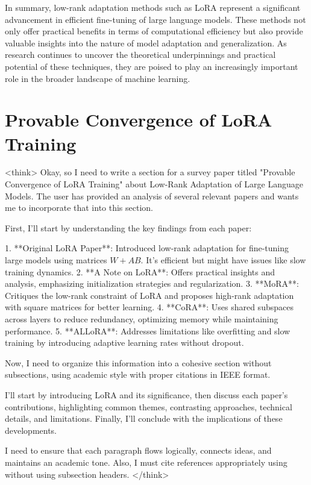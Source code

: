 \documentclass[conference]{IEEEtran}
\begin{document}
In summary, low-rank adaptation methods such as LoRA represent a significant advancement in efficient fine-tuning of large language models. These methods not only offer practical benefits in terms of computational efficiency but also provide valuable insights into the nature of model adaptation and generalization. As research continues to uncover the theoretical underpinnings and practical potential of these techniques, they are poised to play an increasingly important role in the broader landscape of machine learning.

\section{Provable Convergence of LoRA Training}
<think>
Okay, so I need to write a section for a survey paper titled "Provable Convergence of LoRA Training" about Low-Rank Adaptation of Large Language Models. The user has provided an analysis of several relevant papers and wants me to incorporate that into this section. 

First, I'll start by understanding the key findings from each paper:

1. **Original LoRA Paper**: Introduced low-rank adaptation for fine-tuning large models using matrices $W + AB$. It's efficient but might have issues like slow training dynamics.
2. **A Note on LoRA**: Offers practical insights and analysis, emphasizing initialization strategies and regularization.
3. **MoRA**: Critiques the low-rank constraint of LoRA and proposes high-rank adaptation with square matrices for better learning.
4. **CoRA**: Uses shared subspaces across layers to reduce redundancy, optimizing memory while maintaining performance.
5. **ALLoRA**: Addresses limitations like overfitting and slow training by introducing adaptive learning rates without dropout.

Now, I need to organize this information into a cohesive section without subsections, using academic style with proper citations in IEEE format.

I'll start by introducing LoRA and its significance, then discuss each paper's contributions, highlighting common themes, contrasting approaches, technical details, and limitations. Finally, I'll conclude with the implications of these developments.

I need to ensure that each paragraph flows logically, connects ideas, and maintains an academic tone. Also, I must cite references appropriately using \cite{} without using subsection headers.
</think>
\end{document}
